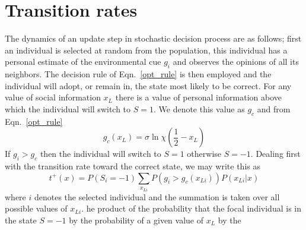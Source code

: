 \documentclass[3p,number,sort&compress,times]{elsarticle}
\begin{document}
\section{Transition rates}
The dynamics of an update step in stochastic decision process are as follows; first an individual is selected at random from the population, this individual has a personal estimate of the environmental cue $g_i$ and observes the opinions of all its neighbors. The decision rule of Eqn.~\ref{opt_rule} is then employed and the individual will adopt, or remain in, the state most likely to be correct.
For any value of social information $x_L$ there is a value of personal information above which the individual will switch to $S=1$. We denote this value as $g_c$ and from Eqn.~\ref{opt_rule} 
\begin{equation}
g_c(x_L) = \sigma\ln\chi  \left(\frac{1}{2}-x_L\right) 
\end{equation}
If $g_i>g_c$ then the individual will switch to $S=1$ otherwise $S=-1$. 
Dealing first with the transition rate toward the correct state, we may write this as
\begin{equation}
t^+(x) = P(S_i=-1)\sum_{x_{Li}}P\left(g_i>g_c(x_{Li})\right)P\left(x_{Li}|x\right)
\end{equation}
where $i$ denotes the selected individual and the summation is taken over all possible values of $x_{Li}$.
he product of the probability that the focal individual is in the state $S=-1$ by the probability of a given value of $x_L$ by the 


%
%
%

\end{document}
